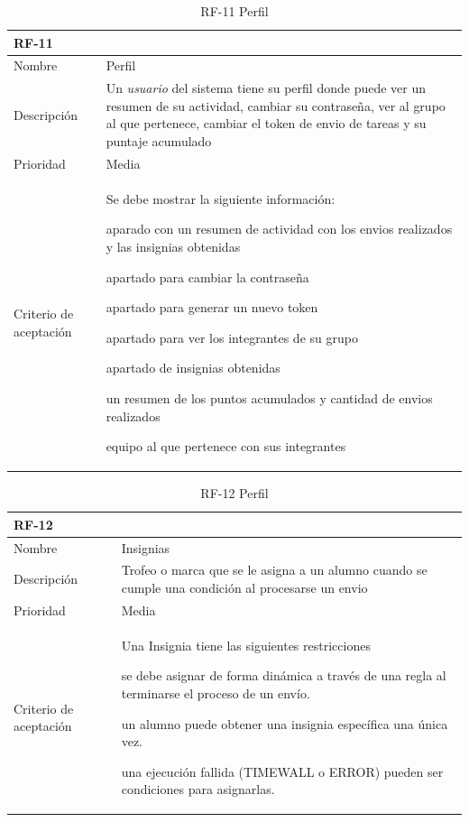 \documentclass[11pt,spanish,listoffigures,listoftables]{tfgetsinf}
\begin{document}
\begin{table}[ht!]
	\centering
	\begin{tabular}{ |p{4cm}||p{10cm}|  }
		\multicolumn{2}{l}{\textbf{RF-11}} \\
		\hline
		Nombre & Perfil \\
		\hline
		Descripción & Un \textit{usuario} del sistema tiene su perfil donde puede ver un resumen de su actividad, cambiar su contraseña, ver al \gls{grupo} al que pertenece, cambiar el token de \gls{envio} de \gls{tarea}s y su puntaje acumulado  \\
		\hline
		Prioridad & Media\\
		\hline
		Criterio de aceptación & Se debe mostrar la siguiente información: \newline
		\begin{tabitem}
			\item aparado con un resumen de actividad con los \gls{envio}s realizados y las \gls{insignia}s obtenidas
			\item apartado para cambiar la contraseña
			\item apartado para generar un nuevo token
			\item apartado para ver los integrantes de su \gls{grupo}
			\item apartado de \gls{insignia}s obtenidas
			\item un resumen de los puntos acumulados y cantidad de \gls{envio}s realizados
			\item equipo al que pertenece con sus integrantes
		\end{tabitem} \\
		\hline
	\end{tabular}
	\caption{RF-11 Perfil}
	\label{table:11}
\end{table}

\begin{table}[ht!]
	\centering
	\begin{tabular}{ |p{4cm}||p{10cm}|  }
		\multicolumn{2}{l}{\textbf{RF-12}} \\
		\hline
		Nombre & Insignias \\
		\hline
		Descripción & Trofeo o marca que se le asigna a un \gls{alumno} cuando se cumple una condición al procesarse un \gls{envio}  \\
		\hline
		Prioridad & Media\\
		\hline
		Criterio de aceptación & Una Insignia tiene las siguientes restricciones \newline
		\begin{tabitem}
			\item se debe asignar de forma dinámica a través de una regla al terminarse el proceso de un envío.
			\item un \gls{alumno} puede obtener una \gls{insignia} específica una única vez.
			\item una ejecución fallida (TIMEWALL o ERROR) pueden ser condiciones para asignarlas.
		\end{tabitem} \\
		\hline
	\end{tabular}
	\caption{RF-12 Perfil}
	\label{table:12}
\end{table}
\end{document}
